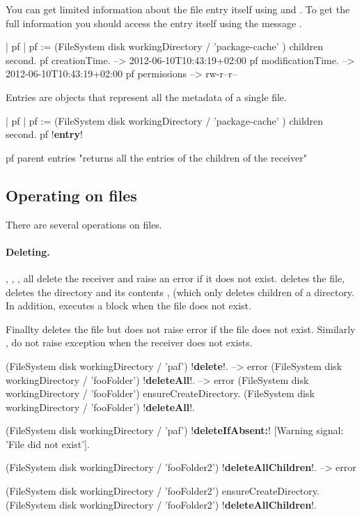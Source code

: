 \documentclass[a4paper,10pt,twoside]{book}
\begin{document}
You can get limited information about the file entry itself using  and . 
To get the full information you should access the entry itself using the message . 

\begin{code}{}
| pf |
pf := (FileSystem disk workingDirectory / 'package-cache' ) children second.
pf creationTime.
	--> 2012-06-10T10:43:19+02:00
pf modificationTime.
	--> 2012-06-10T10:43:19+02:00
pf permissions
	--> rw-r--r--
\end{code}

Entries are objects that represent all the metadata of a single file. 
\begin{code}{}
| pf |
pf := (FileSystem disk workingDirectory / 'package-cache' ) children second.
pf !\textbf{entry}!

pf parent entries
	"returns all the entries of the children of the receiver"
\end{code}


\subsection{Operating on files}
There are several operations on files.


\paragraph{Deleting.}
, , , all delete the receiver and raise an error if it does not exist. 
 deletes the file,  deletes the directory and its contents ,  (which only deletes children of a directory.  In addition,  executes a block when the file does not exist.

Finallty  deletes the file but does not raise error if the file does not exist. Similarly ,  do not raise exception when the receiver does not exists. 




\begin{code}{}
(FileSystem disk workingDirectory / 'paf') !\textbf{delete}!.
  --> error
(FileSystem disk workingDirectory / 'fooFolder') !\textbf{deleteAll}!.
  --> error
(FileSystem disk workingDirectory / 'fooFolder') ensureCreateDirectory.
(FileSystem disk workingDirectory / 'fooFolder') !\textbf{deleteAll}!.

(FileSystem disk workingDirectory / 'paf') !\textbf{deleteIfAbsent:}! [Warning signal: 'File did not exist'].

(FileSystem disk workingDirectory / 'fooFolder2') !\textbf{deleteAllChildren}!.
  --> error

(FileSystem disk workingDirectory / 'fooFolder2') ensureCreateDirectory.
(FileSystem disk workingDirectory / 'fooFolder2') !\textbf{deleteAllChildren}!.
\end{code}
\end{document}
